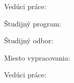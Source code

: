 


Vedúci práce: \mySupervisor

\medskip{}
\myDate


\newpage
\thispagestyle{empty}
\mbox{}
\newpage





Študijný program: \myStudyProgram

Študijný odbor: \myDegreeCourse

Miesto vypracovania: \myInstitute

Vedúci práce: \mySupervisor

\medskip{}

\myDate


\newpage
\thispagestyle{empty}
\mbox{}
\newpage

